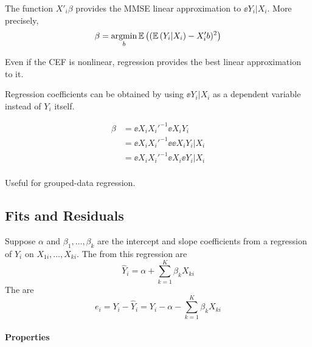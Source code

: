 \documentclass[11pt]{article}
\begin{document}
\begin{theorem}
	The function $X'_i\beta$ provides the MMSE linear approximation to $\ee{Y_i|X_i}$. More precisely,
	\begin{equation}
		\beta = \argmin_{b} \ee{(\ee{Y_i|X_i} - X'_i b)^2}
	\end{equation}
\end{theorem}

\begin{interpretation}
	Even if the CEF is nonlinear, regression provides the best linear approximation to it.
\end{interpretation}

\begin{corollary}[]
	Regression coefficients can be obtained by using $\ee{Y_i|X_i}$ as a dependent variable instead of $Y_i$ itself.
\end{corollary}
\begin{align*}
	\beta &= \ee{X_i X_i'}^{-1} \ee{X_i Y_i} \tag{Linear Regression} \\
	 &= \ee{X_i X_i'}^{-1} \ee{\ee{X_i Y_i|X_i}} \tag{LIE} \\
	 &= \ee{X_i X_i'}^{-1} \ee{X_i \ee{Y_i|X_i}} \\
\end{align*}

\begin{remark}
	Useful for grouped-data regression.
\end{remark}

\subsection{Fits and Residuals}

Suppose $\alpha$ and $\beta_1,\ldots, \beta_k$ are the intercept and slope coefficients from a regression of $Y_i$ on $X_{1i},\ldots,X_{ki}$. The  from this regression are
\begin{equation}
\hat{Y}_{i}=\alpha+\sum_{k=1}^{K} \beta_{k} X_{k i}
\end{equation}
The  are
\begin{equation}
e_{i}=Y_{i}-\hat{Y}_{i}=Y_{i}-\alpha-\sum_{k=1}^{K} \beta_{k} X_{k i}
\end{equation}

\paragraph*{Properties}
\end{document}
